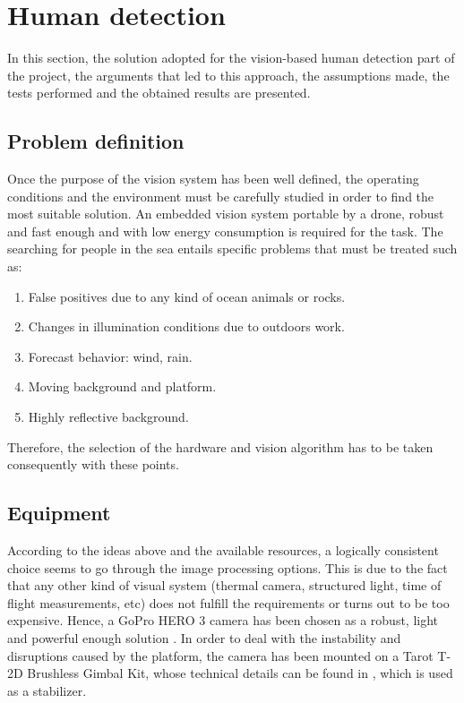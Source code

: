 \chapter{Human detection}
\label{sec:vision}
In this section, the solution adopted for the vision-based human detection part of the project,
the arguments that led to this approach, the assumptions made,
the tests performed and the obtained results are presented. 

\section{Problem definition}
Once the purpose of the vision system has been well defined,
the operating conditions and the environment must be carefully studied in order to find the most suitable solution.
An embedded vision system portable by a drone, robust and fast enough and with low energy consumption is required for the task. 
The searching for people in the sea entails specific problems that must be treated such as:

\begin{enumerate}[itemsep=1mm,topsep=1mm,leftmargin=.35in]
    \label{list: problem_def}
    \item False positives due to any kind of ocean animals or rocks.
    \item Changes in illumination conditions due to outdoors work.
    \item Forecast behavior: wind, rain.
    \item Moving background and platform.
    \item Highly reflective background.
\end{enumerate}%

Therefore, the selection of the hardware and vision algorithm has to be taken consequently with these points.

\section{Equipment}
According to the ideas above and the available resources,
a logically consistent choice seems to go through the image processing options. 
This is due to the fact that any other kind of visual system
(thermal camera, structured light, time of flight measurements, etc) does not fulfill the requirements or turns out to be too expensive.
Hence, a GoPro HERO 3 camera has been chosen as a robust, light and powerful enough solution \cite{ref:GoPro}.
In order to deal with the instability and disruptions caused by the platform,
the camera has been mounted on a Tarot T-2D Brushless Gimbal Kit, whose technical details
can be found in \cite{Ref:Gimbal}, which is used as a stabilizer.

